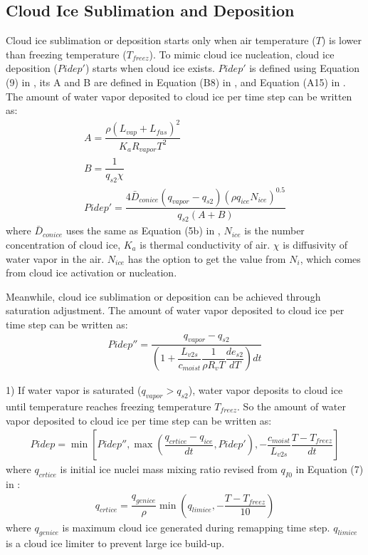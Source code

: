 \documentclass[letterpaper,titlepage,10pt]{article}
\numberwithin{equation}{section}
\begin{document}

\subsection{Cloud Ice Sublimation and Deposition}

Cloud ice sublimation or deposition starts only when air temperature ($T$) is lower than freezing temperature ($T_{freez}$). To mimic cloud ice nucleation, cloud ice deposition ($Pidep'$) starts when cloud ice exists. $Pidep'$ is defined using Equation (9) in \citet{hong2004arev}, its A and B are defined in Equation (B8) in \citet{dudhia1989nume}, and Equation (A15) in \citet{rutledge1984them}. The amount of water vapor deposited to cloud ice per time step can be written as:
\begin{gather}
	A = \dfrac{\rho \left(L_{vap} + L_{fus} \right)^2}{K_a R_{vapor} T^2} \\
	B = \dfrac{1}{q_{s2} \chi} \\
	Pidep' = \dfrac{4 \bar{D}_{conice} \left(q_{vapor} - q_{s2} \right) \left(\rho q_{ice} N_{ice} \right)^{0.5}}{q_{s2} \left(A + B \right)}
\end{gather}
where $\bar{D}_{conice}$ uses the same as Equation (5b) in \citet{hong2004arev}, $N_{ice}$ is the number concentration of cloud ice, $K_a$ is thermal conductivity of air. $\chi$ is diffusivity of water vapor in the air. $N_{ice}$ has the option to get the value from $N_i$, which comes from cloud ice activation or nucleation.

Meanwhile, cloud ice sublimation or deposition can be achieved through saturation adjustment. The amount of water vapor deposited to cloud ice per time step can be written as:
\begin{gather}
	Pidep'' = \dfrac{q_{vapor} - q_{s2}}{\left(1 + \dfrac{L_{v2s}}{c_{moist}} \dfrac{1}{\rho R_v T} \dfrac{de_{s2}}{dT} \right) dt}
\end{gather}

1) If water vapor is saturated ($q_{vapor} > q_{s2}$), water vapor deposits to cloud ice until temperature reaches freezing temperature $T_{freez}$. So the amount of water vapor deposited to cloud ice per time step can be written as:
\begin{gather} \label{eq:pv2i}
	Pidep = \min \left[Pidep'', \max \left(\dfrac{q_{crtice} - q_{ice}}{dt}, Pidep'\right), - \dfrac{c_{moist}}{L_{v2s}} \dfrac{T - T_{freez}}{dt} \right]
\end{gather}
where $q_{crtice}$ is initial ice nuclei mass mixing ratio revised from $q_{I0}$ in Equation (7) in \citet{hong2004arev}:
\begin{gather} \label{eq:qcrtice}
	q_{crtice} = \dfrac{q_{genice}}{\rho} \min \left(q_{limice}, - \dfrac{T - T_{freez}}{10} \right)
\end{gather}
where $q_{genice}$ is maximum cloud ice generated during remapping time step. $q_{limice}$ is a cloud ice limiter to prevent large ice build-up.
\end{document}
